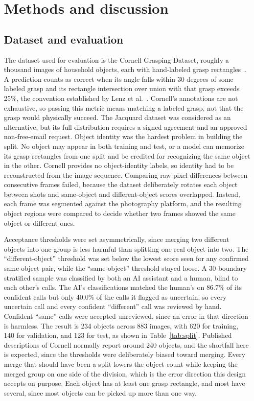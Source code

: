 \documentclass[12pt,letterpaper]{article}
\begin{document}
\section{Methods and discussion}

\subsection{Dataset and evaluation}

The dataset used for evaluation is the Cornell Grasping Dataset,
roughly a thousand images of household objects, each with hand-labeled
grasp rectangles~\cite{jiang2011}. A prediction counts as correct when
its angle falls within 30 degrees of some labeled grasp and its
rectangle intersection over union with that grasp exceeds 25\%, the
convention established by Lenz et al.~\cite{lenz2015}. Cornell's annotations are not
exhaustive, so passing this metric means matching a labeled grasp, not
that the grasp would physically succeed. The Jacquard dataset was
considered as an alternative, but its full distribution requires a
signed agreement and an approved non-free-email request. Object
identity was the hardest problem in building the split. No object may
appear in both training and test, or a model can memorize its grasp
rectangles from one split and be credited for recognizing the same
object in the other. Cornell provides no object-identity labels, so
identity had to be reconstructed from the image sequence. Comparing raw
pixel differences between consecutive frames failed, because the
dataset deliberately rotates each object between shots and same-object
and different-object scores overlapped. Instead, each frame was
segmented against the photography platform, and the resulting object
regions were compared to decide whether two frames showed the same
object or different ones.

Acceptance thresholds were set asymmetrically, since merging two
different objects into one group is less harmful than splitting one
real object into two. The ``different-object'' threshold was set below
the lowest score seen for any confirmed same-object pair, while the
``same-object'' threshold stayed loose. A 30-boundary stratified sample
was classified by both an AI assistant and a human, blind to each
other's calls. The AI's classifications matched the human's on 86.7\%
of its confident calls but only 40.0\% of the calls it flagged as
uncertain, so every uncertain call and every confident ``different'' call
was reviewed by hand. Confident ``same'' calls were accepted unreviewed,
since an error in that direction is harmless. The result is 234 objects
across 883 images, with 620 for training, 140 for validation, and 123
for test, as shown in Table~\ref{tab:split}. Published descriptions of
Cornell normally report around 240 objects, and the shortfall here is
expected, since the thresholds were deliberately
biased toward merging. Every merge that should have been a split lowers
the object count while keeping the merged group on one side of the
division, which is the error direction this design accepts on purpose.
Each object has at least one grasp rectangle, and most have several,
since most objects can be picked up more than one way.
\end{document}
